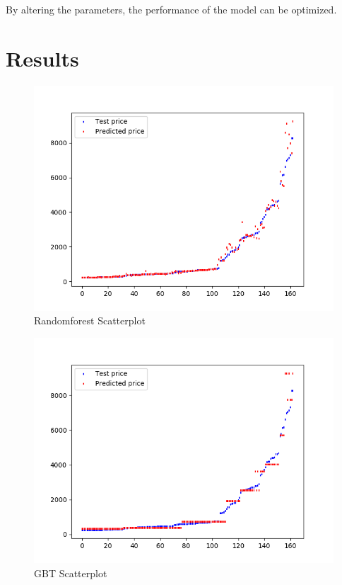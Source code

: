 \documentclass[sigconf]{acmart}
\begin{document}
By altering the parameters, the performance of the model can be optimized.

\section{Results}

\begin{figure}[!ht]
  \centering\includegraphics[width=\columnwidth]{images/RandomForestscatterplot.png}
  \caption{Randomforest Scatterplot}
  \label{scpl:ran}
\end{figure}

\begin{figure}[!ht]
  \centering\includegraphics[width=\columnwidth]{images/GBTscatterplot.png}
  \caption{GBT Scatterplot}
  \label{scpl:gbt}
\end{figure}
\end{document}

